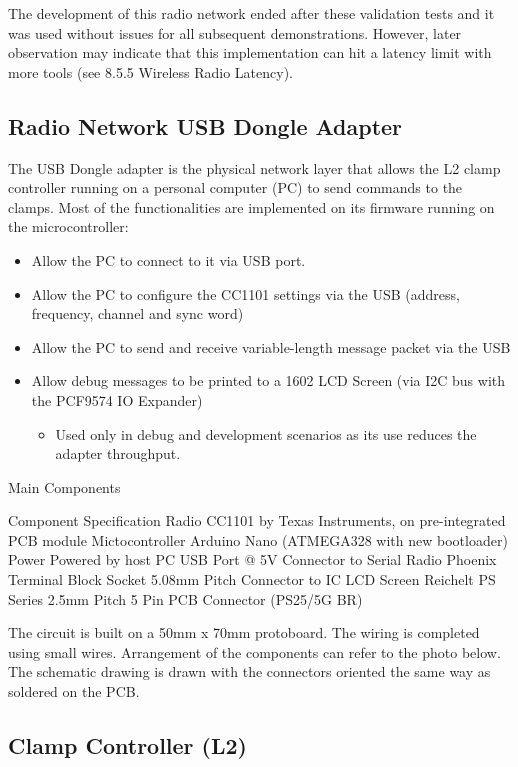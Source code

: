 The development of this radio network ended after these validation tests and it was used without issues for all subsequent demonstrations. However, later observation may indicate that this implementation can hit a latency limit with more tools (see 8.5.5 Wireless Radio Latency).

\subsection{Radio Network USB Dongle Adapter}
\label{subsection:exploration_2_radio_network_usb_dongle_adapter}

The USB Dongle adapter is the physical network layer that allows the L2 clamp controller running on a personal computer (PC) to send commands to the clamps. Most of the functionalities are implemented on its firmware running on the microcontroller:
\begin{itemize}
    \item Allow the PC to connect to it via USB port.
    \item Allow the PC to configure the CC1101 settings via the USB (address, frequency, channel and sync word)
    \item Allow the PC to send and receive variable-length message packet via the USB
    \item Allow debug messages to be printed to a 1602 LCD Screen (via I2C bus with the PCF9574 IO Expander)
    \begin{itemize}
        \item Used only in debug and development scenarios as its use reduces the adapter throughput.
    \end{itemize}
\end{itemize}

Main Components

Component
Specification
Radio
CC1101 by Texas Instruments, on pre-integrated PCB module
Mictocontroller
Arduino Nano (ATMEGA328 with new bootloader)
Power
Powered by host PC USB Port @ 5V
Connector to Serial Radio
Phoenix Terminal Block Socket 5.08mm Pitch
Connector to IC LCD Screen
Reichelt PS Series 2.5mm Pitch 5 Pin PCB Connector (PS25/5G BR)  


The circuit is built on a 50mm x 70mm protoboard. The wiring is completed using small wires. Arrangement of the components can refer to the photo below. The schematic drawing is drawn with the connectors oriented the same way as soldered on the PCB.

\subsection{Clamp Controller (L2)}
\label{subsection:exploration_2_clamp_controller_l2}

